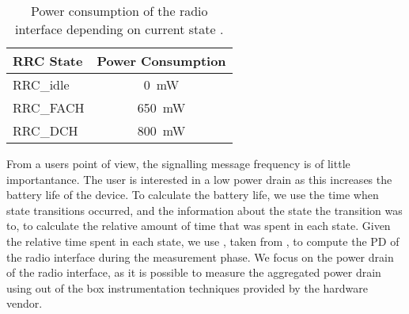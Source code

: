 \begin{table}
  \centering
  \caption{Power consumption of the  radio interface depending on current  state \cite{Qian2011a}.}
  \label{tab:network:network_traces:calculating_metrics:power_consumption}  
  \begin{tabular}{lc}
  	\toprule
    \gls{RRC} State & Power Consumption\\
    \midrule
    \gls{RRC_idle} & \SI{0}{\milli\watt}\\
    \gls{RRC_FACH} & \SI{650}{\milli\watt}\\
    \gls{RRC_DCH} & \SI{800}{\milli\watt}\\
    \bottomrule
  \end{tabular}
\end{table}

From a users point of view, the signalling message frequency is of little importantance.
The user is interested in a low power drain as this increases the battery life of the device.
To calculate the battery life, we use the time when state transitions occurred, and the information about the state the transition was to, to calculate the relative amount of time that was spent in each state.
Given the relative time spent in each state, we use , taken from \cite{Qian2011a}, to compute the \gls{PD} of the radio interface during the measurement phase.
We focus on the power drain of the radio interface, as it is possible to measure the aggregated power drain using out of the box instrumentation techniques provided by the hardware vendor.